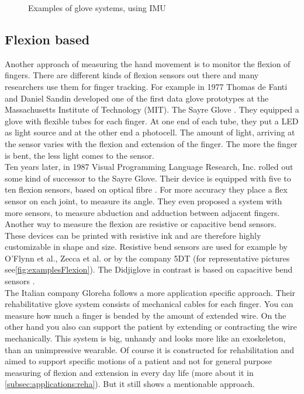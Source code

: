 \begin{figure}[h]
	\hfill
	
	\caption{Examples of glove systems, using \ac{IMU}}
	\label{fig:examplesIMU}
\end{figure}

\subsection{Flexion based} \label{subsec:approaches:flexion}
Another approach of measuring the hand movement is to monitor the flexion of fingers. There are different kinds of flexion sensors out there and many researchers use them for finger tracking. For example in 1977 Thomas de Fanti and Daniel Sandin developed one of the first data glove prototypes at the Massachusetts Institute of Technology (MIT). The Sayre Glove  \cite{sturman1994survey}. They equipped a glove with flexible tubes for each finger. At one end of each tube, they put a LED as light source and at the other end a photocell. The amount of light, arriving at the sensor varies with the flexion and extension of the finger. The more the finger is bent, the less light comes to the sensor.\\
Ten years later, in 1987 Visual Programming Language Research, Inc. rolled out some kind of successor to the Sayre Glove. Their device is equipped with five to ten flexion sensors, based on optical fibre \cite{zimmerman1985optical}. For more accuracy they place a flex sensor on each joint, to measure its angle. They even proposed a system with more sensors, to measure abduction and adduction between adjacent fingers.\\
Another way to measure the flexion are resistive or capacitive bend sensors. These devices can be printed with resistive ink and are therefore highly customizable in shape and size. Resistive bend sensors are used for example by O'Flynn et al., Zecca et al. or by the company 5DT (for representative pictures see\ref{fig:examplesFlexion}). The Didjiglove in contrast is based on capacitive bend sensors \cite{sturman1994survey}.\\
The Italian company Gloreha \cite{Gloreha} follows a more application specific approach. Their rehabilitative glove system consists of mechanical cables for each finger. You can measure how much a finger is bended by the amount of extended wire. On the other hand you also can support the patient by extending or contracting the wire mechanically. This system is big, unhandy and looks more like an exoskeleton, than an unimpressive wearable. Of course it is constructed for rehabilitation and aimed to support specific motions of a patient and not for general purpose measuring of flexion and extension in every day life (more about it in \ref{subsec:applications:reha}). But it still shows a mentionable approach.

